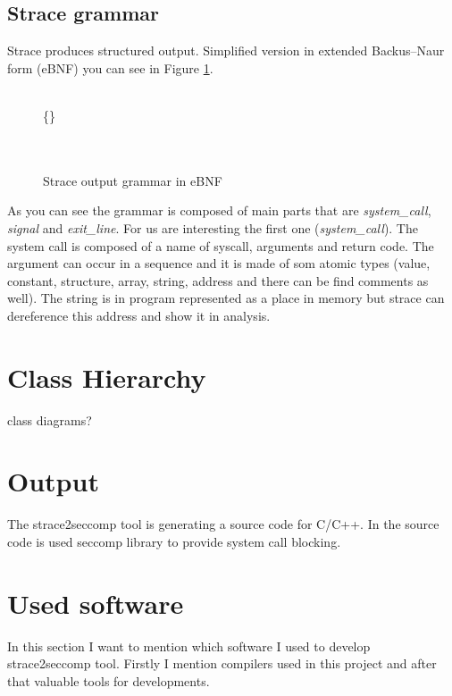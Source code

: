 \subsection{Strace grammar}
Strace produces structured output. Simplified version in extended Backus–Naur form (eBNF)\cite{ISO14977}
you can see in Figure \ref{strace_grammar_simple}.

\begin{figure}[h]
	\label{strace_grammar_simple}
	\begin{bnf*}
		{ \bnfor {} \bnfor {}}\\
		{ \bnfsp  {} \bnfsp \{\} \bnfsp {} \bnfsp {} \bnfsp {}}\\
			{ \bnfsp {} \bnfsp {}}\\
		{ \bnfsp {} \bnfsp {}}\\
	\end{bnf*}
	\caption{Strace output grammar in eBNF}
\end{figure}

As you can see the grammar is composed of main parts that are \emph{system\_call}, \emph{signal} and \emph{exit\_line}.
For us are interesting the first one (\emph{system\_call}).
The system call is composed of a name of syscall, arguments and return code.
The argument can occur in a sequence and it is made of som atomic types
(value, constant, structure, array, string, address and there can be find comments as  well).
The string is in program represented as a place in memory but strace can dereference this address
and show it in analysis.

\section{Class Hierarchy}
class diagrams?

\section{Output}
The strace2seccomp tool is generating a source code for C/C++.
In the source code is used seccomp library to provide system call blocking.

\section{Used software}
In this section I want to mention which software I used to develop strace2seccomp tool.
Firstly I mention compilers used in this project and after that valuable tools for developments.

